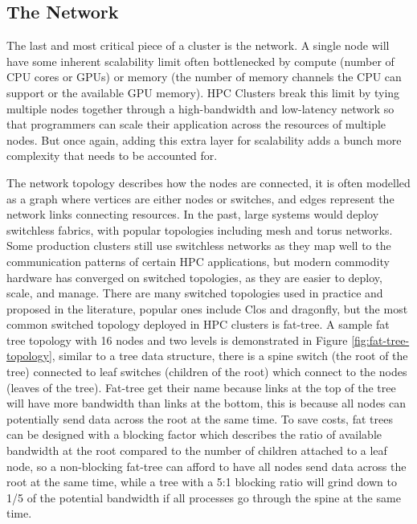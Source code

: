 \subsection{The Network}
The last and most critical piece of a cluster is the network.  
A single node will have some inherent scalability limit often bottlenecked by compute (number of CPU cores or GPUs) or memory (the number of memory channels the CPU can support or the available GPU memory).
HPC Clusters break this limit by tying multiple nodes together through a high-bandwidth and low-latency network so that programmers can scale their application across the resources of multiple nodes.
But once again, adding this extra layer for scalability adds a bunch more complexity that needs to be accounted for.



The network topology describes how the nodes are connected, it is often modelled as a graph where vertices are either nodes or switches, and edges represent the network links connecting resources.
In the past, large systems would deploy switchless fabrics, with popular topologies including mesh and torus networks.
Some production clusters still use switchless networks as they map well to the communication patterns of certain HPC applications, but modern commodity hardware has converged on switched topologies, as they are easier to deploy, scale, and manage. 
There are many switched topologies used in practice and proposed in the literature, popular ones include Clos and dragonfly, but the most common switched topology deployed in HPC clusters is fat-tree.
A sample fat tree topology with 16 nodes and two levels is demonstrated in Figure \ref{fig:fat-tree-topology}, similar to a tree data structure, there is a spine switch (the root of the tree) connected to leaf switches (children of the root) which connect to the nodes (leaves of the tree).
Fat-tree get their name because links at the top of the tree will have more bandwidth than links at the bottom, this is because all nodes can potentially send data across the root at the same time.
To save costs, fat trees can be designed with a blocking factor which describes the ratio of available bandwidth at the root compared to the number of children attached to a leaf node, so a non-blocking fat-tree can afford to have all nodes send data across the root at the same time, while a tree with a 5:1 blocking ratio will grind down to 1/5 of the potential bandwidth if all processes go through the spine at the same time.

